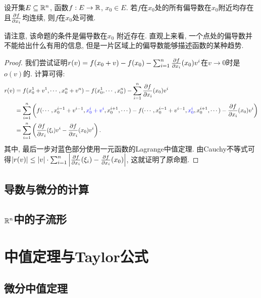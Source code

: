 \begin{proposition}{}
	设开集$E \subseteq \mathbb{R} ^n$, 函数$f: E \to \mathbb{R}$, $x_0 \in E$. 若$f$在$x_0$处的所有偏导数在$x_0$附近均存在且$\frac{\partial f}{\partial x_i}$均连续, 则$f$在$x_0$处可微. 
\end{proposition}
\begin{remark}
	请注意, 该命题的条件是偏导数在$x_0${\color{blue} 附近}存在. 直观上来看, 一个点处的偏导数并不能给出什么有用的信息, 但是一片区域上的偏导数能够描述函数的某种趋势. 
\end{remark}
\begin{proof}
	我们尝试证明$r(v)=f(x_0+v)-f(x_0)-\sum_{i=1}^{n} \frac{\partial f}{\partial x_i}(x_0)v^i$在$v \to 0$时是$o(v)$的. 计算可得: 
	\begin{align*}
		r(v) &= f(x_0^1+v^1,\cdots ,x_0^n+v^n) - f(x_0^1,\cdots ,x_0^n) - \sum_{i=1}^{n} \frac{\partial f}{\partial x_i}(x_0)v^i \\
		&= \sum_{i=1}^{n} \left( f(\cdots ,x_0^{i-1}+v^{i-1},{\color{blue} x_0^{i}+v^{i} },x_0^{i+1},\cdots) - f(\cdots ,x_0^{i-1}+v^{i-1},{\color{blue}x_0^{i} },x_0^{i+1},\cdots) - \frac{\partial f}{\partial x_i}(x_0)v^i \right) \\
		&= \sum_{i=1}^{n} \left( \frac{\partial f}{\partial x_i}(\xi _i)v^i - \frac{\partial f}{\partial x_i}(x_0)v^i \right). 
	\end{align*}
	其中, 最后一步对蓝色部分使用一元函数的Lagrange中值定理. 由Cauchy不等式可得$|r(v)| \leq |v| \cdot \sum_{i=1}^{n}\left| \frac{\partial f}{\partial x_i}(\xi _i) - \frac{\partial f}{\partial x_i}(x_0) \right|$, 这就证明了原命题. 
\end{proof}




\subsection{导数与微分的计算}

\subsection{$\mathbb{R} ^n$中的子流形}

\newpage
\section{中值定理与Taylor公式}

\subsection{微分中值定理}

